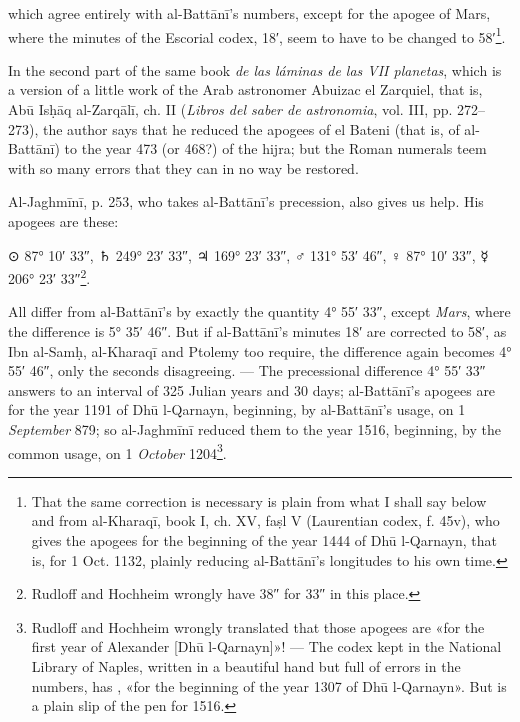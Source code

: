 \documentclass[11pt]{article}
\begin{document}
\par which agree entirely with al-Battānī's numbers, except for the apogee of Mars, where the minutes of the Escorial codex,  18′, seem to have to be changed to  58′\footnote{That the same correction is necessary is plain from what I shall say below and from al-Kharaqī, book I, ch. XV, faṣl V (Laurentian codex, f. 45v), who gives the apogees for the beginning of the year 1444 of Dhū l-Qarnayn, that is, for 1 Oct. 1132, plainly reducing al-Battānī's longitudes to his own time.}.\par
\par In the second part of the same book \emph{de las láminas de las VII planetas}, which is a version of a little work of the Arab astronomer Abuizac el Zarquiel, that is, Abū Isḥāq al-Zarqālī, ch. II (\emph{Libros del saber de astronomia}, vol. III, pp. 272–273), the author says that he reduced the apogees of el Bateni (that is, of al-Battānī) to the year 473 (or 468?) of the hijra; but the Roman numerals teem with so many errors that they can in no way be restored.\par
\par Al-Jaghmīnī, p. 253, who takes al-Battānī's precession, also gives us help. His apogees are these:\par
\par\begin{center}{\MoonFont\upshape ⊙} 87° 10′ 33″, {\MoonFont\upshape ♄} 249° 23′ 33″, {\MoonFont\upshape ♃} 169° 23′ 33″, {\MoonFont\upshape ♂} 131° 53′ 46″, {\MoonFont\upshape ♀} 87° 10′ 33″, {\MoonFont\upshape ☿} 206° 23′ 33″\footnote{Rudloff and Hochheim wrongly have  38″ for  33″ in this place.}.\end{center}
\par All differ from al-Battānī's by exactly the quantity 4° 55′ 33″, except \emph{Mars}, where the difference is 5° 35′ 46″. But if al-Battānī's minutes  18′ are corrected to  58′, as Ibn al-Samḥ, al-Kharaqī and Ptolemy too require, the difference again becomes 4° 55′ 46″, only the seconds disagreeing. — The precessional difference 4° 55′ 33″ answers to an interval of 325 Julian years and 30 days; al-Battānī's apogees are for the year 1191 of Dhū l-Qarnayn, beginning, by al-Battānī's usage, on 1 \emph{September} 879; so al-Jaghmīnī reduced them to the year 1516, beginning, by the common usage, on 1 \emph{October} 1204\footnote{Rudloff and Hochheim wrongly translated that those apogees are «for the first year of Alexander [Dhū l-Qarnayn]»! — The codex kept in the National Library of Naples, written in a beautiful hand but full of errors in the numbers, has , «for the beginning of the year 1307 of Dhū l-Qarnayn». But  is a plain slip of the pen for  1516.}.\par
\end{document}
